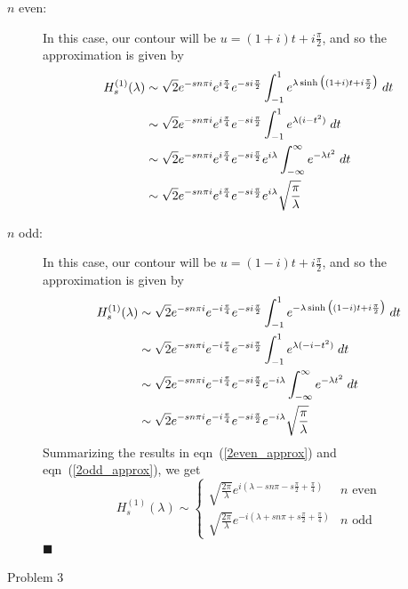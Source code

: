 \documentclass[11pt]{article}
\newcommand{\lam}{\lambda}
\newcommand{\eqr}[1]{eqn~(\ref{#1})}
\begin{document}
\begin{description}
\item[\;\;$n$ even:]
In this case, our contour will be $u = (1+i)t + i\frac{\pi}{2}$, and so the approximation is given by
\begin{align}
\notag
  H_s^{(1)}(\lam) &\sim
  \sqrt{2}
  e^{-sn\pi i}
  e^{i\frac{\pi}{4}}
  e^{-si\frac{\pi}{2}}
  \int_{-1}^1
  e^{
    \lam \sinh\big( (1+i)t + i\frac{\pi}{2} \big)
  }
  \; dt
  \\
  \notag
  &\sim
  \sqrt{2}
  e^{-sn\pi i}
  e^{i\frac{\pi}{4}}
  e^{-si\frac{\pi}{2}}
  \int_{-1}^1
  e^{
    \lam (i - t^2)
  }
  \; dt
  \\
  \notag
  &\sim
  \sqrt{2}
  e^{-sn\pi i}
  e^{i\frac{\pi}{4}}
  e^{-si\frac{\pi}{2}}
  e^{i\lam}
  \int_{-\infty}^\infty
  e^{
    -\lam t^2
  }
  \; dt
  \\
  \label{2even_approx}
  &\sim
  \sqrt{2}
  e^{-sn\pi i}
  e^{i\frac{\pi}{4}}
  e^{-si\frac{\pi}{2}}
  e^{i\lam}
  \sqrt{\frac{\pi}{\lam}}
\end{align}
\item[\;\;$n$ odd:]
In this case, our contour will be $u = (1-i)t + i\frac{\pi}{2}$, and so the approximation is given by
\begin{align}
\notag
  H_s^{(1)}(\lam) &\sim
  \sqrt{2}
  e^{-sn\pi i}
  e^{-i\frac{\pi}{4}}
  e^{-si\frac{\pi}{2}}
  \int_{-1}^1
  e^{
    -\lam \sinh\big( (1-i)t + i\frac{\pi}{2} \big)
  }
  \; dt
  \\
  \notag
  &\sim
  \sqrt{2}
  e^{-sn\pi i}
  e^{-i\frac{\pi}{4}}
  e^{-si\frac{\pi}{2}}
  \int_{-1}^1
  e^{
    \lam (-i - t^2)
  }
  \; dt
  \\
  \notag
  &\sim
  \sqrt{2}
  e^{-sn\pi i}
  e^{-i\frac{\pi}{4}}
  e^{-si\frac{\pi}{2}}
  e^{-i\lam}
  \int_{-\infty}^\infty
  e^{
    -\lam t^2
  }
  \; dt
  \\
  \label{2odd_approx}
  &\sim
  \sqrt{2}
  e^{-sn\pi i}
  e^{-i\frac{\pi}{4}}
  e^{-si\frac{\pi}{2}}
  e^{-i\lam}
  \sqrt{\frac{\pi}{\lam}}
\end{align}
Summarizing the results in \eqr{2even_approx} and \eqr{2odd_approx}, we get
$$
H_s^{(1)}(\lam)
\sim
\begin{cases}
  \sqrt{\frac{2\pi}{\lam}}
  e^{i(
   \lam
   - sn\pi
   - s\frac{\pi}{2}
   + \frac{\pi}{4} 
  )}
& n \text{ even}
\\
  \sqrt{\frac{2\pi}{\lam}}
  e^{-i(
   \lam
   + sn\pi
   + s\frac{\pi}{2}
   + \frac{\pi}{4} 
  )}
& n \text{ odd}
\end{cases}
$$
\hfill $\blacksquare$
\item[Problem 3]

\end{description}
\end{document}
